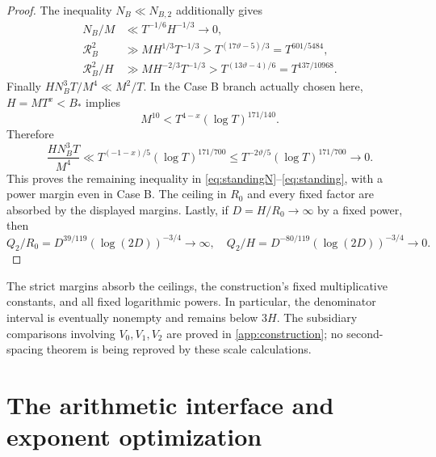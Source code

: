 \documentclass[11pt,reqno]{amsart}
\numberwithin{equation}{section}
\theoremstyle{definition}
\theoremstyle{remark}
\newcommand{\vth}{\vartheta}
\begin{document}
\begin{proof}
The inequality $N_B\ll N_{B,2}$ additionally gives
\begin{align}
 N_B/M&\ll T^{-1/6}H^{-1/3}\longrightarrow0,\\
 \mathcal R_B^2&\gg MH^{1/3}T^{-1/3}
 >T^{(17\vth-5)/3}=T^{601/5484},\\
 \mathcal R_B^2/H&\gg MH^{-2/3}T^{-1/3}
 >T^{(13\vth-4)/6}=T^{137/10968}.
\end{align}
Finally $HN_B^3T/M^4\ll M^2/T$. In the Case B branch actually chosen here,
$H=MT^x<B_*$ implies
\[
 M^{10}<T^{4-x}(\log T)^{171/140}.
\]
Therefore
\[
 \frac{HN_B^3T}{M^4}
 \ll T^{(-1-x)/5}(\log T)^{171/700}
 \le T^{-2\vth/5}(\log T)^{171/700}\longrightarrow0.
\]
This proves the remaining inequality in \eqref{eq:standingN}--\eqref{eq:standing}, with a power margin even in Case B. The ceiling in $R_0$ and every fixed factor are absorbed by the displayed margins. Lastly, if $D=H/R_0\to\infty$ by a fixed power, then
\[
 Q_2/R_0=D^{39/119}(\log(2D))^{-3/4}\to\infty,
 \quad Q_2/H=D^{-80/119}(\log(2D))^{-3/4}\to0.
\]
\end{proof}

The strict margins absorb the ceilings, the construction's fixed multiplicative constants, and all fixed logarithmic powers. In particular, the denominator interval is eventually nonempty and remains below $3H$.
The subsidiary comparisons involving $V_0,V_1,V_2$ are proved in \cref{app:construction}; no second-spacing theorem is being reproved by these scale calculations.

\section{The arithmetic interface and exponent optimization}\label{sec:interface}\label{sec:optimization}
\end{document}
